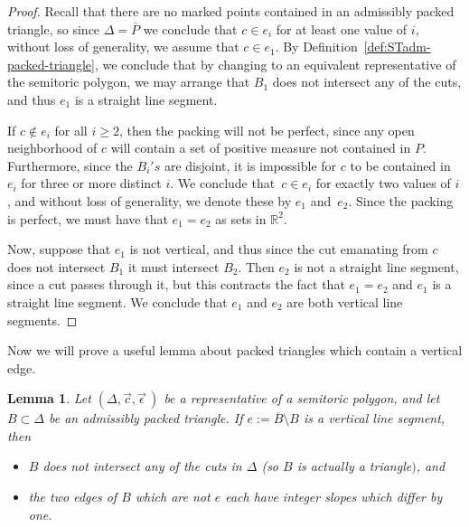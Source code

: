 \documentclass[10pt,a4paper]{amsart}
\numberwithin{equation}{section}
\newtheorem{Lemma}[Theorem]{Lemma}
\def\R{{\mathbb R}}
\newcommand{\De}{\Delta}
\newcommand{\strep}{(\De,\vec{c},\vec{\epsilon}\,)}
\theoremstyle{definition}
\theoremstyle{plain}
\theoremstyle{plain}
\begin{document}
\begin{proof}
 Recall that there are no marked points contained in an admissibly packed triangle, so since $\De = \overline{P}$ we conclude that $c\in e_i$ for at least one value of $i$, without loss of generality, we assume that $c\in e_1$.
 By Definition~\ref{def:STadm-packed-triangle}, we conclude that by changing to an equivalent representative of the semitoric polygon, we may arrange that $B_1$ does not intersect any of the cuts, and thus $e_1$ is a straight line segment.

 If $c\notin e_i$ for all $i\geq 2$, then the packing will not be perfect, since any open neighborhood of $c$ will contain a set of positive measure not contained in $P$. Furthermore, since the $B_i's$ are disjoint, it is impossible for $c$ to be contained in $e_i$ for three or more distinct $i$. We conclude that~$c\in e_i$ for exactly two values of $i$, and without loss of generality, we denote these by $e_1$ and~$e_2$. Since the packing is perfect, we must have that $e_1=e_2$ as sets in $\R^2$.

 Now, suppose that $e_1$ is not vertical, and thus since the cut emanating from $c$ does not intersect $B_1$ it must intersect $B_2$. Then $e_2$ is not a straight line segment, since a cut passes through it, but this contracts the fact that $e_1=e_2$ and $e_1$ is a straight line segment. We conclude that $e_1$ and $e_2$ are both vertical line segments.
\end{proof}

Now we will prove a useful lemma about packed triangles which contain a vertical edge.

\begin{Lemma}\label{lemma:slope}
Let $\strep$ be a representative of a semitoric polygon, and let $B\subset\De$ be an admissibly packed triangle.
If $e:= \overline{B}\setminus B$ is a vertical line segment, then
\begin{itemize}\itemsep=0pt
 \item $B$ does not intersect any of the cuts in $\De$ {\rm (}so $B$ is actually a triangle$)$, and
 \item the two edges of $B$ which are not $e$ each have integer slopes which differ by one.
\end{itemize}
\end{Lemma}
\end{document}
